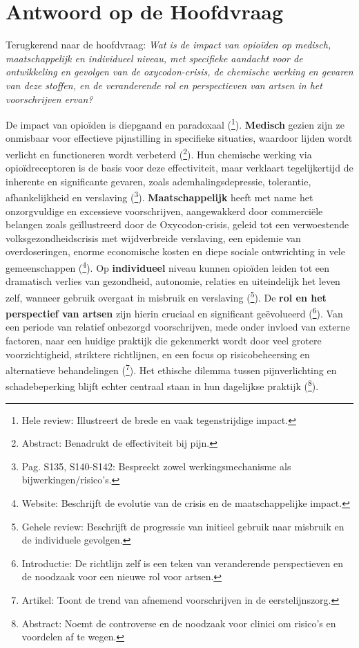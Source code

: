 \documentclass[11pt, a4paper]{report} %
\begin{document}
\section{Antwoord op de Hoofdvraag}
Terugkerend naar de hoofdvraag: \textit{Wat is de impact van opioïden op medisch, maatschappelijk en individueel niveau, met specifieke aandacht voor de ontwikkeling en gevolgen van de oxycodon-crisis, de chemische werking en gevaren van deze stoffen, en de veranderende rol en perspectieven van artsen in het voorschrijven ervan?}

De impact van opioïden is diepgaand en paradoxaal (\cite{Maclean2020EconomicStudiesOpioid}\footnote{Hele review: Illustreert de brede en vaak tegenstrijdige impact.}).
\textbf{Medisch} gezien zijn ze onmisbaar voor effectieve pijnstilling in specifieke situaties, waardoor lijden wordt verlicht en functioneren wordt verbeterd (\cite{Riley2008OxycodoneReview}\footnote{Abstract: Benadrukt de effectiviteit bij pijn.}). Hun chemische werking via opioïdreceptoren is de basis voor deze effectiviteit, maar verklaart tegelijkertijd de inherente en significante gevaren, zoals ademhalingsdepressie, tolerantie, afhankelijkheid en verslaving (\cite{Trescot2008OpioidPharm}\footnote{Pag. S135, S140-S142: Bespreekt zowel werkingsmechanisme als bijwerkingen/risico's.}).
\textbf{Maatschappelijk} heeft met name het onzorgvuldige en excessieve voorschrijven, aangewakkerd door commerciële belangen zoals geïllustreerd door de Oxycodon-crisis, geleid tot een verwoestende volksgezondheidscrisis met wijdverbreide verslaving, een epidemie van overdoseringen, enorme economische kosten en diepe sociale ontwrichting in vele gemeenschappen (\cite{CDCUnderstandingEpidemic}\footnote{Website: Beschrijft de evolutie van de crisis en de maatschappelijke impact.}).
Op \textbf{individueel} niveau kunnen opioïden leiden tot een dramatisch verlies van gezondheid, autonomie, relaties en uiteindelijk het leven zelf, wanneer gebruik overgaat in misbruik en verslaving (\cite{Cicero2017Review}\footnote{Gehele review: Beschrijft de progressie van initieel gebruik naar misbruik en de individuele gevolgen.}).
De \textbf{rol en het perspectief van artsen} zijn hierin cruciaal en significant geëvolueerd (\cite{Dowell2016CDCGuideline}\footnote{Introductie: De richtlijn zelf is een teken van veranderende perspectieven en de noodzaak voor een nieuwe rol voor artsen.}). Van een periode van relatief onbezorgd voorschrijven, mede onder invloed van externe factoren, naar een huidige praktijk die gekenmerkt wordt door veel grotere voorzichtigheid, striktere richtlijnen, en een focus op risicobeheersing en alternatieve behandelingen (\cite{AAFP2024OpioidDecrease}\footnote{Artikel: Toont de trend van afnemend voorschrijven in de eerstelijnszorg.}). Het ethische dilemma tussen pijnverlichting en schadebeperking blijft echter centraal staan in hun dagelijkse praktijk (\cite{Hooten2021OpioidsChronicPain}\footnote{Abstract: Noemt de controverse en de noodzaak voor clinici om risico's en voordelen af te wegen.}).
\end{document}

